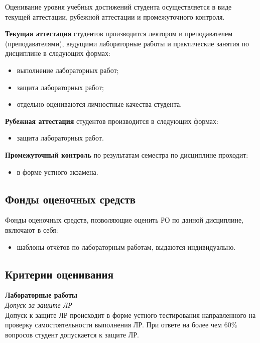 
Оценивание уровня учебных достижений студента осуществляется в виде текущей аттестации, рубежной аттестации и промежуточного контроля.

\textbf{Текущая аттестация} студентов производится лектором и преподавателем (преподавателями), ведущими лабораторные работы и практические занятия по дисциплине в следующих формах:
\begin{itemize}

\item выполнение лабораторных работ;
\item защита лабораторных работ;
\item отдельно оцениваются личностные качества студента.
\end{itemize}

\textbf{Рубежная аттестация} студентов производится в следующих формах:
\begin{itemize}
\item защита лабораторных работ.
\end{itemize}

\textbf{Промежуточный контроль} по результатам семестра по дисциплине проходит:
\begin{itemize}
\item в форме устного экзамена.
\end{itemize}


\subsection*{Фонды оценочных средств}

Фонды оценочных средств, позволяющие оценить РО по данной дисциплине, включают в себя:
\begin{itemize}
\item шаблоны отчётов по лабораторным работам, выдаются индивидуально.
\end{itemize}

\subsection*{Критерии оценивания}


\noindent\textbf{Лабораторные работы}\\
\textit{Допуск за защите ЛР}\\
Допуск к защите ЛР происходит в форме устного тестирования направленного на проверку самостоятельности выполнения ЛР. При ответе на более чем 60\% вопросов студент допускается к защите ЛР.\\

